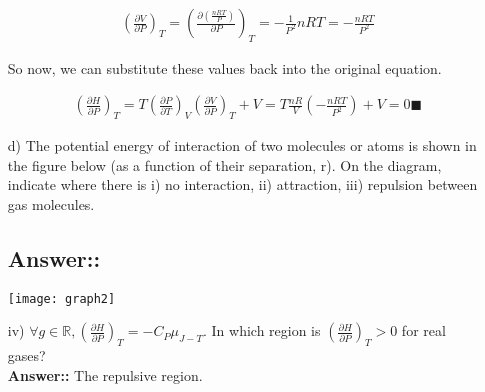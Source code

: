 \documentclass[12pt]{book}
\begin{document}
\begin{itemize}
    \begin{align*}
        \left(\frac{\partial V}{\partial P}\right)_T=\left(\frac{\partial\left(\frac{nRT}{P}\right)}{\partial P}\right)_T=-\frac{1}{P^2}nRT=-\frac{nRT}{P^2}
    \end{align*}

    So now, we can substitute these values back into the original equation.

    \begin{align*}
        \left(\frac{\partial H}{\partial P}\right)_T=T\left(\frac{\partial P}{\partial T}\right)_V\left(\frac{\partial V}{\partial P}\right)_T+V=T\frac{nR}{V}\left(-\frac{nRT}{P^2}\right)+V=0\blacksquare
    \end{align*}
    

    \item[d)]The potential energy of interaction of two molecules or atoms is shown in the figure below
    (as a function of their separation, r). On the diagram, indicate where there is i) no interaction, ii)
    attraction, iii) repulsion between gas molecules.

    \subsection*{Answer::}

    \texttt{[image: graph2]}

    iv) $\forall g\in \mathbb{R}, \left(\frac{\partial H}{\partial P}\right)_T=-C_P\mu_{J-T}$. In which region is $\left(\frac{\partial H}{\partial P}\right)_T>0$ for real gases?\\
    \textbf{Answer::} The repulsive region.
\end{itemize}
\end{document}
